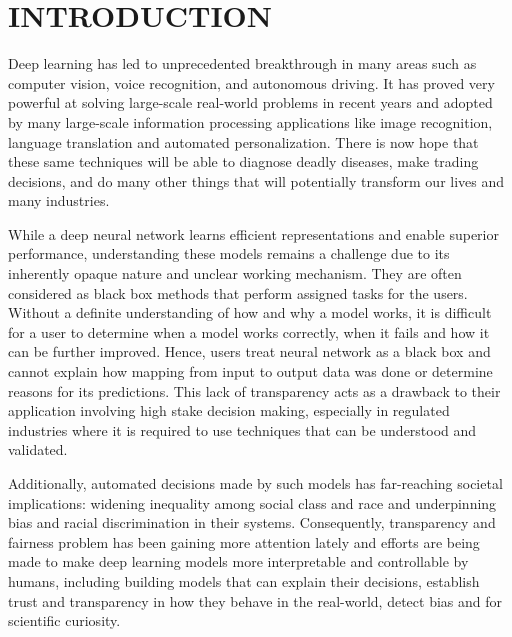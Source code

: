 %
%
\chapter{INTRODUCTION}
\thispagestyle{empty}


Deep learning has led to unprecedented breakthrough in many areas such as computer vision, voice recognition, and autonomous driving.  It has proved very powerful at solving large-scale real-world problems in recent years and adopted by many large-scale information processing applications like image recognition, language translation and automated personalization. There is now hope that these same techniques will be able to diagnose deadly diseases,  make trading decisions, and do many other things that will potentially transform our lives and many industries. 

While a deep neural network learns efficient representations and enable superior performance, understanding these models remains a challenge due to its inherently opaque nature and unclear working mechanism. They are often considered as black box methods that perform assigned tasks for the users. Without a definite understanding of how and why a model works, it is difficult for a user to determine when a model works correctly, when it fails and how it can be further improved. Hence, users treat neural network as a black box and cannot explain how mapping from input to output data was done or determine reasons for its predictions. This lack of transparency acts as a drawback to their application involving high stake decision making, especially in regulated industries where it is required to use techniques that can be understood and validated.

Additionally, automated decisions made by such models has far-reaching societal implications: widening inequality among social class and race and underpinning bias and racial discrimination in their systems. Consequently, transparency and fairness problem has been gaining more attention lately and efforts are being made to make deep learning models more interpretable and controllable by humans, including building models that can explain their decisions, establish trust and transparency in how they behave in the real-world, detect bias and for scientific curiosity.

